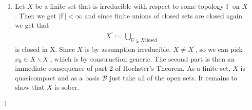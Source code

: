 \newcommand{\sheet}{3}




\maketitle{}

\begin{exercise}{1}
    \begin{enumerate}
        \item Let $X$ be a finite set that is irreducible with 
        respect to some topology $\mathbb{F}$ on $X$. Then we get
        $\mid \mathbb{F} \mid<\infty$ and since finite unions of
        closed sets are closed again we get that
        \begin{align*}
            X^{\prime}:=\bigcup_{U \subsetneq X \text{closed}}
        \end{align*}
        is closed in X. Since $X$ is by assumption irreducible,
        $X\neq X^{\prime}$, so we can pick $x_0\in X \backslash X^{\prime}$,
        which is by construction generic. The second part is then an immediate
        consequence of part 2 of Hochster's Theorem. As a finite set, $X$ is 
        quasicompact and as a basis $\mathcal{B}$ just take all of the open sets. 
        It remains to show that $X$ is sober. 
    \end{enumerate}
\end{exercise}{1}



